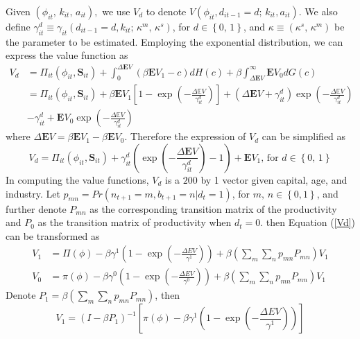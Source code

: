 Given $\left(\phi_{it},\,k_{it},\,a_{it}\right),$ we use $V_{d}$
to denote $V\left(\phi_{it},d_{it-1}=d;\,k_{it},a_{it}\right)$.
We also define $\gamma_{it}^{d}\equiv\gamma_{it}\left(d_{it-1}=d,k_{it};\,\kappa^{m},\,\kappa^{s}\right)$,
for $d\in\left\{ 0,\,1\right\} $, and $\kappa\equiv\left(\kappa^{s},\,\kappa^{m}\right)$
be the parameter to be estimated. Employing the exponential distribution,
we can express the value function as 
\begin{align*}
V_{d} & =\Pi_{it}\left(\phi_{it},\mathbf{S}_{it}\right)+\int_{0}^{\Delta \mathbf{E}V}\left(\beta\mathbf{E}V_{1}-c\right)dH\left(c\right)+\beta\int_{\Delta \mathbf{E}V}^{\infty}\mathbf{E}V_{0}dG\left(c\right)\\
 & =\Pi_{it}\left(\phi_{it},\mathbf{S}_{it}\right)+ \beta \mathbf{E}V_{1}\left[1-\exp(-\frac{\Delta\mathbb{E}V}{\gamma_{it}^{d}})\right]+\left(\Delta \mathbf{E}V+\gamma_{it}^{d}\right)\exp\left(-\frac{\Delta\mathbb{E}V}{\gamma_{it}^{d}}\right)\\
 & -\gamma_{it}^{d}+\mathbf{E}V{}_{0}\exp\left({-\frac{\Delta\mathbb{E}V}{\gamma_{it}^{d}}}\right)
\end{align*}
where $\Delta \mathbf{E}V=\beta\mathbf{E}V_{1}-\beta\mathbf{E}V_{0}$. Therefore the expression of $V_{d}$
can be simplified as 
\begin{equation}
V_{d}=\Pi_{it}\left(\phi_{it},\mathbf{S}_{it}\right)+\gamma_{it}^{d}\left(\exp\left(-\frac{\Delta \mathbf{E}V}{\gamma_{it}^{d}}\right)-1\right)+\mathbf{E}V_{1},\,\text{for }d\in\left\{ 0,\,1\right\} \label{Vd}
\end{equation}
In computing the value functions, $V_{d}$ is a $200$ by 1 vector
given capital, age, and industry. Let $p_{mn}=Pr\left(n_{t+1}=m,b_{t+1}=n|d_{t}=1\right)$,
for $m,\,n\in\left\{ 0,1\right\} $, and further denote $P_{mn}$
as the corresponding transition matrix of the productivity and $P_{0}$
as the transition matrix of productivity when $d_{t}=0$. then Equation
(\ref{Vd}) can be transformed as 
\begin{align}
V_{1} & =\Pi\left(\phi\right)-\beta\gamma^{1}\left(1-\exp\left(-\frac{\Delta EV}{\gamma^{1}}\right)\right)+\beta\left(\sum_{m}\sum_{n}p_{mn}P_{mn}\right)V_{1}\label{V1}\\
V_{0} & =\pi\left(\phi\right)-\beta\gamma^{0}\left(1-\exp\left(-\frac{\Delta EV}{\gamma^{0}}\right)\right)+\beta\left(\sum_{m}\sum_{n}p_{mn}P_{mn}\right)V_{1}\label{V0}
\end{align}
Denote $P_{1}=\beta\left(\sum_{m}\sum_{n}p_{mn}P_{mn}\right)$, then
\[
V_{1}=\left(I-\beta P_{1}\right)^{-1}\left[\pi\left(\phi\right)-\beta\gamma^{1}\left(1-\exp\left(-\frac{\Delta EV}{\gamma^{1}}\right)\right)\right]
\]
